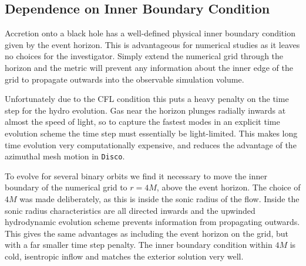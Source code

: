 \documentclass{emulateapj}
\newcommand{\Disco}{{\texttt{Disco}}}
\newcommand{\model}[1]{{Model \texttt{#1}}}
\begin{document}
\begin{figure*}
	\caption{\label{fi:spec} Spectra of \model{1} (blue circles), \model{2} (orange crosses), and \model{3} (green triangles) at $t = 28 T_{bin}$, obtained by integrating over the ray-traced intensity (e.g. in Fig \ref{fi:im}).  Solid lines are Novikov-Thorne spectra with $\dot{M}$ of the inner boundary averaged over $20 T_{bin}$ to $29 T_{bin}$ for each model.  Only the $R<40M$ region is included in the integration, to remove the effect of truncation at the outer disk edge.  The inclination angle $i=60^\circ$ and the distance $D=1kpc$.  The data are consistent with the Novikov-Thorne profile at low energies but show a high energy excess, consistent with the increased shock dissipation and radiative cooling observed at $r\lesssim 10M$.}
\end{figure*}

\subsection{Dependence on Inner Boundary Condition}
\label{subsec:bc}

Accretion onto a black hole has a well-defined physical inner boundary condition given by the event horizon.  This is advantageous for numerical studies as it leaves no choices for the investigator. Simply extend the numerical grid through the horizon and the metric will prevent any information about the inner edge of the grid to propagate outwards into the observable simulation volume.  

Unfortunately due to the CFL condition this puts a heavy penalty on the time step for the hydro evolution.  Gas near the horizon plunges radially inwards at almost the speed of light, so to capture the fastest modes in an explicit time evolution scheme the time step must essentially be light-limited. This makes long time evolution very computationally expensive, and reduces the advantage of the azimuthal mesh motion in \Disco{}.

To evolve for several binary orbits we find it necessary to move the inner boundary of the numerical grid to $r=4M$, above the event horizon.  The choice of $4M$ was made deliberately, as this is inside the sonic radius of the flow. Inside the sonic radius characteristics are all directed inwards and the upwinded hydrodynamic evolution scheme prevents information from propagating outwards.  This gives the same advantages as including the event horizon on the grid, but with a far smaller time step penalty.  The inner boundary condition within $4M$ is cold, isentropic inflow and matches the exterior solution very well.
\end{document}
